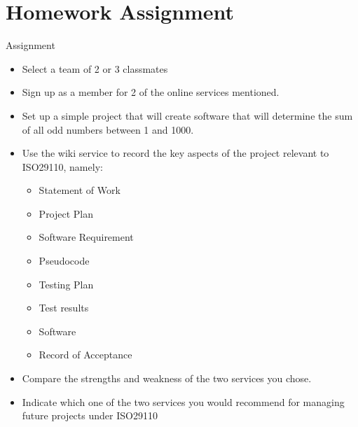 \section{Homework Assignment}
\begin{frame}{Assignment}
\begin{itemize}
\item Select a team of 2 or 3 classmates
\item Sign up as a member for 2 of the online services mentioned.
\item Set up a simple project that will create software that will determine the sum of all odd numbers between 1 and 1000.
\item Use the wiki service to record the key aspects of the project relevant to ISO29110, namely:
\begin{itemize}
\item Statement of Work
\item Project Plan
\item Software Requirement
\item Pseudocode
\item Testing Plan
\item Test results
\item Software
\item Record of Acceptance
\end{itemize}
\item Compare the strengths and weakness of the two services you chose.
\item Indicate which one of the two services you would recommend for managing future projects under ISO29110
\end{itemize}
\end{frame}

\endinput

